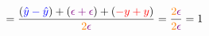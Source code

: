 \documentclass{article}
\begin{document}
\begin{displaymath}
=\frac{(\textcolor{blue}{\hat{y}-\hat{y}})+(\textcolor{violet}{\epsilon+\epsilon})+
(\textcolor{red}{-y+y})}{\textcolor{orange}{2}\textcolor{violet}{\epsilon}}
=\frac{\textcolor{orange}{2}\textcolor{violet}{\epsilon}}
{\textcolor{orange}{2}\textcolor{violet}{\epsilon}}
= 1
\end{displaymath}
\end{document}
